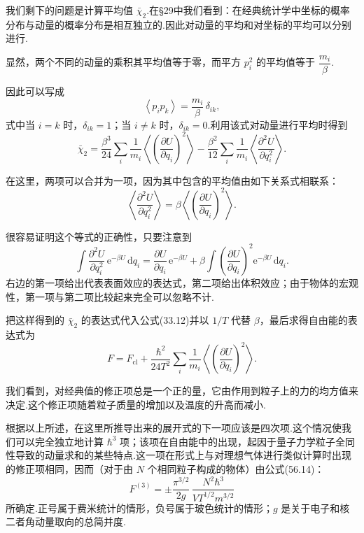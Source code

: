 我们剩下的问题是计算平均值 $\bar{\chi}_2$.在§29中我们看到：在经典统计学中坐标的概率分布与动量的概率分布是相互独立的.因此对动量的平均和对坐标的平均可以分别进行.

显然，两个不同的动量的乘积其平均值等于零，而平方 $p_i^2$ 的平均值等于 $\dfrac{m_i}{\beta}$.

因此可以写成
\begin{equation*}
  \left\langle p_ip_k\right\rangle=\frac{m_i}{\beta}\,\delta_{ik},
\end{equation*}
式中当 $i=k$ 时，$\delta_{ik}=1$；当 $i\neq k$ 时，$\delta_{ik}=0$.利用该式对动量进行平均时得到
\begin{equation}
  \bar{\chi}_2=\frac{\beta^3}{24}\sum_i\frac{1}{m_i}
  \left\langle\left(\frac{\partial U}{\partial q_i}\right)^2\right\rangle
  -\frac{\beta^2}{12}\sum_i\frac{1}{m_i}
  \left\langle\frac{\partial^2U}{\partial q_i^2}\right\rangle.
\end{equation}

在这里，两项可以合并为一项，因为其中包含的平均值由如下关系式相联系：
\begin{equation}
  \left\langle\frac{\partial^2U}{\partial q_i^2}\right\rangle
  =\beta\left\langle\left(\frac{\partial U}{\partial q_i}\right)^2\right\rangle.
\end{equation}

很容易证明这个等式的正确性，只要注意到
\begin{equation*}
  \int\frac{\partial^2U}{\partial q_i^2}\,\mathrm{e}^{-\beta U}\,\mathrm{d}q_i
  =\frac{\partial U}{\partial q_i}\,\mathrm{e}^{-\beta U}
  +\beta\int\left(\frac{\partial U}{\partial q_i}\right)^2\mathrm{e}^{-\beta U}\,\mathrm{d}q_i.
\end{equation*}
右边的第一项给出代表表面效应的表达式，第二项给出体积效应；由于物体的宏观性，第一项与第二项比较起来完全可以忽略不计.

把这样得到的 $\bar{\chi}_2$ 的表达式代入公式(33.12)并以 $1/T$ 代替 $\beta$，最后求得自由能的表达式为
\begin{equation}
  F=F_{\mathrm{cl}}+\frac{\hbar^2}{24T^2}\sum_i\frac{1}{m_i}
  \left\langle\left(\frac{\partial U}{\partial q_i}\right)^2\right\rangle.
\end{equation}

我们看到，对经典值的修正项总是一个正的量，它由作用到粒子上的力的均方值来决定.这个修正项随着粒子质量的增加以及温度的升高而减小.

根据以上所述，在这里所推导出来的展开式的下一项应该是四次项.这个情况使我们可以完全独立地计算 $\hbar^3$ 项；该项在自由能中的出现，起因于量子力学粒子全同性导致的动量求和的某些特点.这一项在形式上与对理想气体进行类似计算时出现的修正项相同，因而（对于由 $N$ 个相同粒子构成的物体）由公式(56.14)：
\begin{equation}
  F^{(3)}=\pm\frac{\pi^{3/2}}{2g}\,\frac{N^2\hbar^3}{VT^{1/2}m^{3/2}}
\end{equation}
所确定.正号属于费米统计的情形，负号属于玻色统计的情形；$g$ 是关于电子和核二者角动量取向的总简并度.

